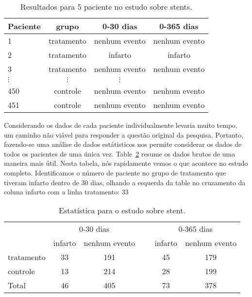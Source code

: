 \begin{table}[h]
\centering
\begin{tabular}{l ccc}
\hline
Paciente	&	grupo	&	0-30 dias 	&	0-365 dias \\
\hline
1		&	tratamento &	nenhum evento &	nenhum evento \\
2		&	tratamento &	infarto & infarto \\
3		&	tratamento &	nenhum evento & nenhum evento \\
$\vdots$	&	$\vdots$	  &	$\vdots$ \\
450	&	controle &	nenhum evento &	nenhum evento \\
451	&	controle &	nenhum evento &	nenhum evento \\
\hline
\end{tabular}
\caption{Resultados para 5 paciente no estudo sobre stents.}
\label{stentStudyResultsDF}
\end{table}
Considerando os dados de cada paciente individualmente levaria muito tempo, um caminho não viável para responder a questão original da pesquisa. Portanto, fazendo-se uma análise de dados estátisticos nos permite considerar os dados de todos os pacientes de uma única vez. Table~\ref{stentStudyResults} resume os dados brutos de uma maneira mais útil. Nesta tabela, nós rapidamente vemos o que acontece no estudo completo. Identificamos o número de paciente no grupo de tratamento que tiveram infarto dentro de 30 dias, olhando a esquerda da table no cruzamento da coluna infarto com a linha tratamento: 33

\begin{table}[h]
\centering
\begin{tabular}{l cc c cc}
& \multicolumn{2}{c}{0-30 dias} &\hspace{5mm}\ & \multicolumn{2}{c}{0-365 dias} \\
  \cline{2-3} \cline{5-6}
	& 	infarto 	& nenhum evento && 	infarto 	& nenhum evento \\
  \hline
tratamento 	& 33		& 191	&&	45 	& 179 \\
controle 		& 13		& 214	&& 	28	& 199 \\
  \hline
Total				& 46		& 405	&&	73	& 378 \\
  \hline
\end{tabular}
\caption{Estatística  para  o estudo sobre stent.}
\label{stentStudyResults}
\end{table}

